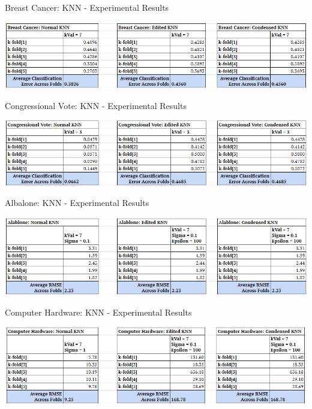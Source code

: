 \documentclass[twoside,11pt]{article}
\begin{document}
\begin{table}[h]
		\centering
		\caption{Breast Cancer: KNN - Experimental Results}
		\label{tab:table2}
		\includegraphics[scale=.7]{BC_ALL_Results}\newline
\end{table}

\begin{table}[h]
		\centering
		\caption{Congressional Vote: KNN - Experimental Results}
		\label{tab:table3}
		\includegraphics[scale=.7]{CVote_ALL_Results}\newline
\end{table}

\begin{table}[h]
	\centering
	\caption{Albalone: KNN - Experimental Results}
	\label{tab:table4}
	\includegraphics[scale=.7]{ABL_ALL_Results}\newline
\end{table}

\begin{table}[h]
	\centering
	\caption{Computer Hardware: KNN - Experimental Results}
	\label{tab:tale5}
	\includegraphics[scale=.7]{CH_ALL_Results}\newline
\end{table}
\end{document}
